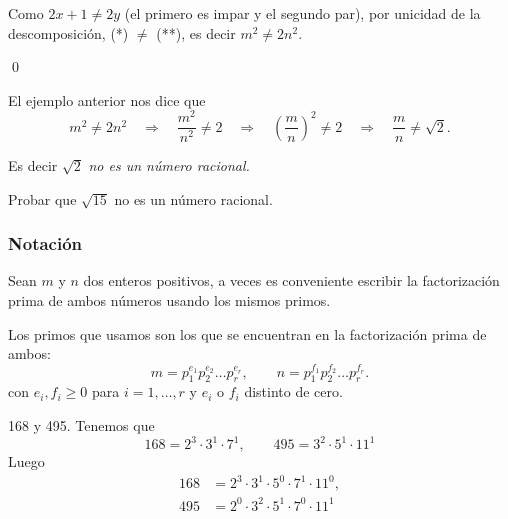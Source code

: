 \documentclass[handout]{beamer} %
\begin{document}
    
    \begin{frame}
        Como $2x+1 \ne 2y$ (el primero es impar y el segundo par), por unicidad de la descomposición, (*) $\ne$ (**), es decir $m^2 \not=2n^2$.
        
        \qed

        \begin{observacion}
            El  ejemplo anterior nos dice que 
            $$
            m^2 \not=2n^2\quad \Rightarrow \quad \frac{m^2}{n^2}\not=2 \quad \Rightarrow \quad \left(\frac{m}{n}\right)^2\not=2 \quad \Rightarrow \quad \frac{m}{n}\not=\sqrt{2}. 
            $$
            
            Es decir $\sqrt{2}$ \textit{no es un número racional.}
        \end{observacion}

        \begin{ejercicio} Probar que $\sqrt{15}$ no es un número racional.
        \end{ejercicio}

    \end{frame}
    
    \begin{frame}\frametitle{Notación}
        
        Sean $m$ y $n$ dos enteros positivos, a veces es conveniente escribir la factorización prima de ambos números usando los mismos primos.
        
        Los primos que usamos son los que se encuentran en la factorización prima de ambos:
        $$
        m=p_1^{e_1}p_2^{e_2}\ldots p_r^{e_r},\qquad
        n=p_1^{f_1}p_2^{f_2}\ldots p_r^{f_r}.
        $$
        con $e_i,f_i \ge 0$ para $i=1,\ldots,r$ y $e_i$ o $f_i$ distinto de cero. 
        \pause
        \begin{ejemplo}
            168 y 495. \pause Tenemos que
            \begin{equation*}
                168 = 2^3 \cdot 3^1 \cdot 7^1, \qquad 495 = 3^2 \cdot 5^1 \cdot 11^1
            \end{equation*}
            Luego 
            \begin{align*}
                168 &= 2^3 \cdot 3^1 \cdot 5^0\cdot 7^1\cdot 11^0, \\
                495 &= 2^0 \cdot3^2 \cdot 5^1 \cdot 7^0 \cdot 11^1
            \end{align*}
        \end{ejemplo}
        
    \end{frame}
    
\end{document}
